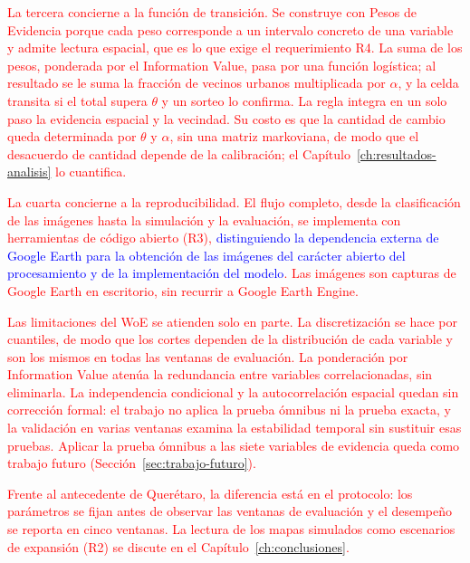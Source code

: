 \textcolor{red}{La tercera concierne a la función de transición. Se construye
con Pesos de Evidencia porque cada peso corresponde a un intervalo concreto de
una variable y admite lectura espacial, que es lo que exige el requerimiento
R4. La suma de los pesos, ponderada por el Information Value, pasa por una
función logística; al resultado se le suma la fracción de vecinos urbanos
multiplicada por $\alpha$, y la celda transita si el total supera $\theta$ y un
sorteo lo confirma. La regla integra en un solo paso la evidencia espacial y la
vecindad. Su costo es que la cantidad de cambio queda determinada por $\theta$
y $\alpha$, sin una matriz markoviana, de modo que el desacuerdo de cantidad
depende de la calibración; el Capítulo~\ref{ch:resultados-analisis} lo
cuantifica.}

\textcolor{red}{La cuarta concierne a la reproducibilidad. El flujo completo,
desde la clasificación de las imágenes hasta la simulación y la evaluación, se
implementa con herramientas de código abierto (R3),}
\textcolor{blue}{distinguiendo la dependencia externa de Google Earth para la
obtención de las imágenes del carácter abierto del procesamiento y de la
implementación del modelo}\textcolor{red}{. Las imágenes son capturas de Google
Earth en escritorio, sin recurrir a Google Earth Engine.}

\textcolor{red}{Las limitaciones del WoE se atienden solo en parte. La
discretización se hace por cuantiles, de modo que los cortes dependen de la
distribución de cada variable y son los mismos en todas las ventanas de
evaluación. La ponderación por Information Value atenúa la redundancia entre
variables correlacionadas, sin eliminarla. La independencia condicional y la
autocorrelación espacial quedan sin corrección formal: el trabajo no aplica la
prueba ómnibus ni la prueba exacta, y la validación en varias ventanas examina
la estabilidad temporal sin sustituir esas pruebas. Aplicar la prueba ómnibus a
las siete variables de evidencia queda como trabajo futuro
(Sección~\ref{sec:trabajo-futuro}).}

\textcolor{red}{Frente al antecedente de Querétaro, la diferencia está en el
protocolo: los parámetros se fijan antes de observar las ventanas de
evaluación y el desempeño se reporta en cinco ventanas. La lectura de los
mapas simulados como escenarios de expansión (R2) se discute en el
Capítulo~\ref{ch:conclusiones}.}


